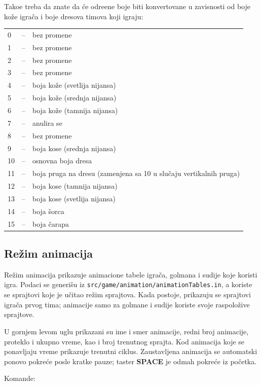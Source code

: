 \documentclass[a4paper,12pt]{article}
\begin{document}
Tako\dj e treba da znate da \'ce odre\dj ene boje biti konvertovane u zavisnosti od boje ko\v ze igra\v ca i boje
dresova timova koji igraju:

\begin{tabular}{lll}
 0 &--& bez promene\\
 1 &--& bez promene\\
 2 &--& bez promene\\
 3 &--& bez promene\\
 4 &--& boja ko\v ze (svetlija nijansa)\\
 5 &--& boja ko\v ze (srednja nijansa)\\
 6 &--& boja ko\v ze (tamnija nijansa)\\
 7 &--& anulira se\\
 8 &--& bez promene\\
 9 &--& boja kose (srednja nijansa)\\
10 &--& osnovna boja dresa\\
11 &--& boja pruga na dresu (zamenjena sa 10 u slu\v caju vertikalnih pruga)\\
12 &--& boja kose (tamnija nijansa)\\
13 &--& boja kose (svetlija nijansa)\\
14 &--& boja \v sorca\\
15 &--& boja \v carapa
\end{tabular}

\newpage
\subsection{Re\v zim animacija}

Re\v zim animacija prikazuje animacione tabele igra\v ca, golmana i sudije koje
koristi igra. Podaci se generi\v su iz
\verb|src/game/animation/animationTables.in|, a koriste se sprajtovi koje je
u\v citao re\v zim sprajtova. Kada postoje, prikazuju se sprajtovi igra\v ca prvog
tima; animacije samo za golmane i sudije koriste svoje raspolo\v zive sprajtove.

U gornjem levom uglu prikazani su ime i smer animacije, redni broj animacije,
proteklo i ukupno vreme, kao i broj trenutnog sprajta. Kod animacija koje se
ponavljaju vreme prikazuje trenutni ciklus. Zaustavljena animacija se automatski
ponovo pokre\'ce posle kratke pauze; taster {\bf SPACE} je odmah pokre\'ce iz
po\v cetka.

\vspace{\baselineskip}
\noindent Komande:
\vspace{\baselineskip}
\end{document}
